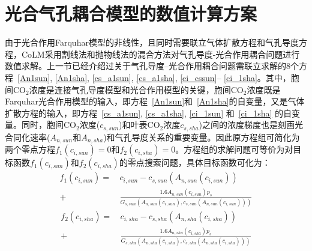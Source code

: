 \section{光合气孔耦合模型的数值计算方案}\label{光合气孔耦合模型的数值计算方案}
由于光合作用Farquhar模型的非线性，且同时需要联立气体扩散方程和气孔导度方程，CoLM采用割线法和抛物线法的混合方法对气孔导度-光合作用耦合问题进行数值求解。上一节已经介绍过关于气孔导度--光合作用耦合问题需联立求解的8个方程~\eqref{An1sun}, \eqref{An1sha}, \eqref{cs_a1sun}, \eqref{cs_a1sha}, \eqref{ei_cssun}--%
\eqref{ci_1sha}。其中，胞间$\mathrm{CO_2}$浓度是连接气孔导度模型和光合作用模型的关键，胞间$\mathrm{CO_2}$浓度既是Farquhar光合作用模型的输入，即方程~\eqref{An1sun}和~\eqref{An1sha}的自变量，又是气体扩散方程的输入，即方程~\eqref{cs_a1sun}, \eqref{cs_a1sha}, \eqref{ci_1sun} 和~\eqref{ci_1sha} 的自变量。同时，胞间$\mathrm{CO_2}$浓度($c_{s,sun}$)和叶表$\mathrm{CO_2}$浓度$c_{s,sha}$)之间的浓度梯度也是刻画光合同化速率($A_{n,sun}$和$A_{n,sha}$)和气孔导度关系的重要变量。因此原方程组可简化为两个零点方程$f_1(c_{i,sun})=0$和$f_2(c_{i,sha})=0$。方程组的求解问题可等价为对目标函数$f_1(c_{i,sun})$和$f_2(c_{i,sha})$的零点搜索问题，具体目标函数可化为：
\begin{align}\label{f1_cisun}
f_{1}\left(c_{i,sun}\right)=&\,c_{i,sun}-c_{s,sun}\left(A_{n,sun}\left(c_{i,sun}\right)\right) \nonumber \\[1ex] 
+& \, \frac{1.6A_{n,sun}\left(c_{i,sun}\right)p_s}{G_{s,sun}\left(A_{n,sun}\left(c_{i,sun}\right),c_{s,sun}\left(A_{n,sun}\left(c_{i,sun}\right)\right)\right)}
\end{align}
\begin{align}\label{f1_cisha}
f_{2}\left(c_{i,sha}\right)=&\,c_{i,sha}-c_{s,sha}\left(A_{n,sha}\left(c_{i,sha}\right)\right) \nonumber \\[1ex] 
+& \, \frac{1.6A_{n,sha}\left(c_{i,sha}\right)p_s}{G_{s,sha}\left(A_{n,sha}\left(c_{i,sha}\right),c_{s,sha}\left(A_{n,sha}\left(c_{i,sha}\right)\right)\right)}
\end{align}

